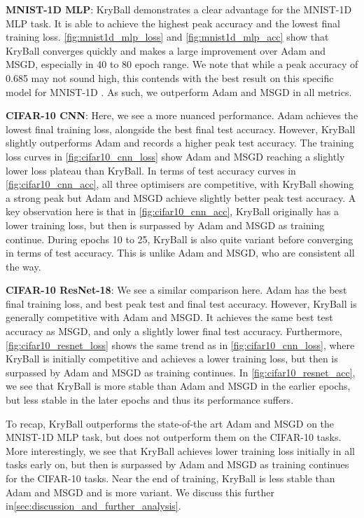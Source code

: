 \textbf{MNIST-1D MLP}: KryBall demonstrates a clear advantage for the MNIST-1D MLP task. It is able to achieve the highest peak accuracy and the lowest final training loss. \cref{fig:mnist1d_mlp_loss} and \cref{fig:mnist1d_mlp_acc} show that KryBall converges quickly and makes a large improvement over Adam and MSGD, especially in 40 to 80 epoch range. We note that while a peak accuracy of 0.685 may not sound high, this contends with the best result on this specific model for MNIST-1D \citep{greydanus_mnist1d}. As such, we outperform Adam and MSGD in all metrics.

\textbf{CIFAR-10 CNN}: Here, we see a more nuanced performance. Adam achieves the lowest final training loss, alongside the best final test accuracy. However, KryBall slightly outperforms Adam and records a higher peak test accuracy. The training loss curves in \cref{fig:cifar10_cnn_loss} show Adam and MSGD reaching a slightly lower loss plateau than KryBall. In terms of test accuracy curves in \cref{fig:cifar10_cnn_acc}, all three optimisers are competitive, with KryBall showing a strong peak but Adam and MSGD achieve slightly better peak test accuracy. A key observation here is that in \cref{fig:cifar10_cnn_acc}, KryBall originally has a lower training loss, but then is surpassed by Adam and MSGD as training continue. During epochs 10 to 25, KryBall is also quite variant before converging in terms of test accuracy. This is unlike Adam and MSGD, who are consistent all the way. 

\textbf{CIFAR-10 ResNet-18}: We see a similar comparison here. Adam has the best final training loss, and best peak test and final test accuracy. However, KryBall is generally competitive with Adam and MSGD. It achieves the same best test accuracy as MSGD, and only a slightly lower final test accuracy. Furthermore, \cref{fig:cifar10_resnet_loss} shows the same trend as in \cref{fig:cifar10_cnn_loss}, where KryBall is initially competitive and achieves a lower training loss, but then is surpassed by Adam and MSGD as training continues. In \cref{fig:cifar10_resnet_acc}, we see that KryBall is more stable than Adam and MSGD in the earlier epochs, but less stable in the later epochs and thus its performance suffers.

To recap, KryBall outperforms the state-of-the art Adam and MSGD on the MNIST-1D MLP task, but does not outperform them on the CIFAR-10 tasks. More interestingly, we see that KryBall achieves lower training loss initially in all tasks early on, but then is surpassed by Adam and MSGD as training continues for the CIFAR-10 tasks. Near the end of training, KryBall is less stable than Adam and MSGD and is more variant. We discuss this further in\cref{sec:discussion_and_further_analysis}.

